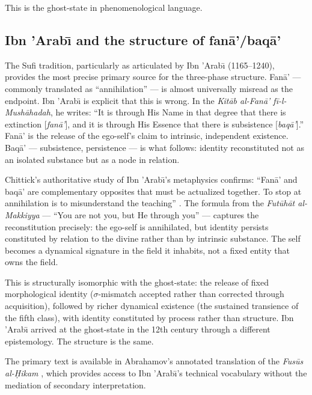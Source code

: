 \documentclass[12pt, a4paper]{article}
\begin{document}
This is the ghost-state in phenomenological language.

\subsection{Ibn 'Arab\={\i} and the structure of fan\={a}'/baq\={a}'}

The Sufi tradition, particularly as articulated by Ibn 'Arab\={\i} (1165--1240), provides the
most precise primary source for the three-phase structure. Fan\={a}' --- commonly translated as
``annihilation'' --- is almost universally misread as the endpoint. Ibn 'Arab\={\i} is
explicit that this is wrong. In the \textit{Kit\={a}b al-Fan\={a}' f\={i}-l-Mush\={a}hadah},
he writes: ``It is through His Name in that degree that there is extinction [\textit{fan\={a}'}],
and it is through His Essence that there is subsistence [\textit{baq\={a}'}].'' Fan\={a}' is
the release of the ego-self's claim to intrinsic, independent existence. Baq\={a}' ---
subsistence, persistence --- is what follows: identity reconstituted not as an isolated
substance but as a node in relation.

Chittick's authoritative study of Ibn 'Arab\={\i}'s metaphysics confirms:
``Fan\={a}' and baq\={a}' are complementary opposites that must be actualized together. To
stop at annihilation is to misunderstand the teaching'' \citep{chittick1989}. The formula
from the \textit{Fut\={u}h\={a}t al-Makkiyya} --- ``You are not you, but He through you''
--- captures the reconstitution precisely: the ego-self is annihilated, but identity persists
constituted by relation to the divine rather than by intrinsic substance. The self becomes a
dynamical signature in the field it inhabits, not a fixed entity that owns the field.

This is structurally isomorphic with the ghost-state: the release of fixed morphological
identity ($\sigma$-mismatch accepted rather than corrected through acquisition), followed by
richer dynamical existence (the sustained transience of the fifth class), with identity
constituted by process rather than structure. Ibn 'Arab\={\i} arrived at the ghost-state in
the 12th century through a different epistemology. The structure is the same.

The primary text is available in Abrahamov's annotated translation of the
\textit{Fus\={u}s al-\d{H}ikam} \citep{abrahamov2015}, which provides access to Ibn
'Arab\={\i}'s technical vocabulary without the mediation of secondary interpretation.
\end{document}
